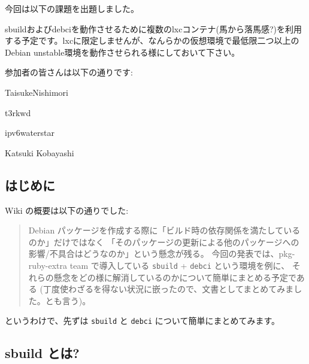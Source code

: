\documentclass[mingoth,a4paper]{jsarticle}
\begin{document}

今回は以下の課題を出題しました。
\begin{screen}
  sbuildおよびdebciを動作させるために複数のlxcコンテナ(馬から落馬感?)を利用
  する予定です。lxcに限定しませんが、なんらかの仮想環境で最低限二つ以上の
  Debian unstable環境を動作させられる様にしておいて下さい。
\end{screen}

参加者の皆さんは以下の通りです:

\begin{prework}{ TaisukeNishimori }
\end{prework}

\begin{prework}{ t3rkwd }
\end{prework}

\begin{prework}{ ipv6waterstar }
\end{prework}

\begin{prework}{ Katsuki Kobayashi }
\end{prework}



\subsection{はじめに}
Wiki の概要は以下の通りでした:
\begin{quote}
  Debian パッケージを作成する際に「ビルド時の依存関係を満たしているのか」だけではなく
  「そのパッケージの更新による他のパッケージへの影響/不具合はどうなのか」という懸念が残る。
  今回の発表では、pkg-ruby-extra team で導入している
  \texttt{sbuild} + \texttt{debci} という環境を例に、
  それらの懸念をどの様に解消しているのかについて簡単にまとめる予定である%
  (丁度使わざるを得ない状況に嵌ったので、文書としてまとめてみました。とも言う)。
\end{quote}
というわけで、先ずは \texttt{sbuild} と \texttt{debci} について簡単にまとめてみます。

\subsection*{sbuild とは?}
\end{document}
